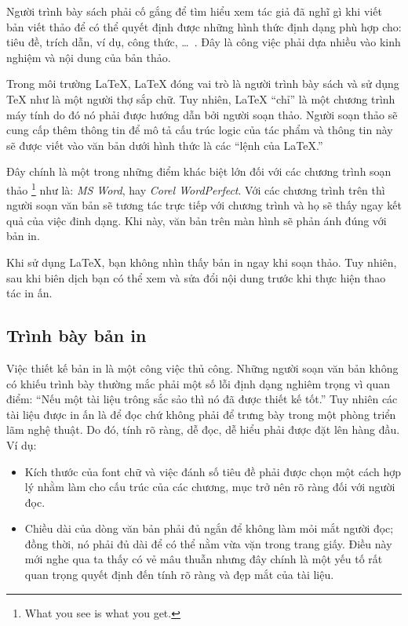 Người trình bày sách phải cố gắng để tìm hiểu xem tác giả đã nghĩ
gì khi viết bản viết thảo để có thể quyết định được những hình
thức định dạng phù hợp cho: tiêu đề, trích dẫn, ví dụ, công thức,
\ldots~. Đây là công việc phải dựa nhiều vào kinh nghiệm và nội dung của
bản thảo.

Trong môi trường \LaTeX{}, \LaTeX{} đóng vai trò là người trình bày sách và sử dụng \TeX{} như là một người thợ sắp chữ. Tuy nhiên, \LaTeX{} ``chỉ'' là một chương trình máy tính do đó nó phải được hướng dẫn bởi người soạn thảo. Người soạn thảo sẽ cung cấp thêm thông tin để mô tả cấu trúc logic của tác phẩm và thông tin này sẽ được viết vào văn bản dưới hình thức là các ``lệnh của \LaTeX{}.''

Đây chính là một trong những điểm khác biệt lớn đối với các chương trình soạn thảo \footnote{What you see is what you get.} như là: \emph{MS Word}, hay \emph{Corel WordPerfect}. Với các chương trình trên thì người soạn văn bản sẽ tương tác trực tiếp với chương trình và họ sẽ thấy ngay kết quả của việc đinh dạng. Khi này, văn bản trên màn hình sẽ phản ánh đúng với bản in.

Khi sử dụng \LaTeX{}, bạn không nhìn thấy bản in ngay khi soạn thảo. Tuy nhiên, sau khi biên dịch bạn có thể xem và sửa đổi nội dung trước khi thực hiện thao tác in ấn.

\subsection{Trình bày bản in}
Việc thiết kế bản in là một công việc thủ công. Những người soạn văn bản không có khiếu trình bày thường mắc phải một số lỗi định dạng nghiêm trọng vì quan điểm: ``Nếu một tài liệu trông sắc sảo thì nó đã được thiết kế tốt.'' Tuy nhiên các tài liệu được in ấn là để đọc chứ không phải để trưng bày trong một phòng triển lãm nghệ thuật. Do đó, tính rõ ràng, dễ đọc, dễ hiểu phải được đặt lên hàng đầu. Ví dụ:

\begin{itemize}
\item Kích thước của font chữ và việc đánh số tiêu đề phải được  chọn một cách hợp lý nhằm làm cho cấu trúc của các chương, mục trở nên rõ ràng đối với người đọc.
\item Chiều dài của dòng văn bản phải đủ ngắn để không làm mỏi mắt người đọc; đồng thời, nó phải đủ dài để có thể nằm vừa vặn trong trang giấy. Điều này mới nghe qua ta thấy có vẻ mâu thuẫn nhưng đây chính là một yếu tố rất quan trọng quyết định đến tính rõ ràng và đẹp mắt của tài liệu.
\end{itemize}

